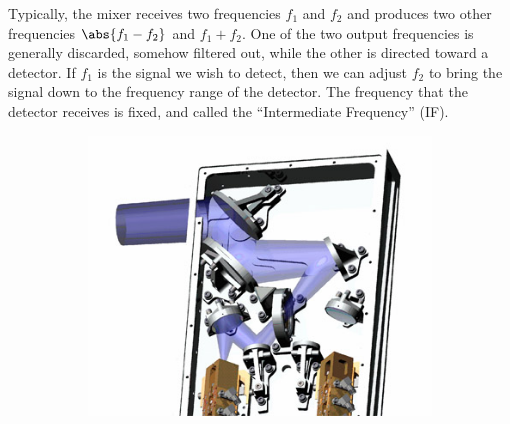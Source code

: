 Typically, the mixer receives two frequencies $f_1$ and $f_2$ and produces two other frequencies $\abs{f_1-f_2}$ and $f_1+f_2$.
One of the two output frequencies is generally discarded, somehow filtered out, while the other is directed toward a detector.
If $f_1$ is the signal we wish to detect, then we can adjust $f_2$ to bring the signal down to the frequency range of the detector.
The frequency that the detector receives is fixed, and called the ``Intermediate Frequency'' (IF).

\begin{figure}[hbtp]
    \centering
    \begin{subfigure}[c]{.7\textwidth}
        \includegraphics[width=\textwidth]{lou_band_5_drawing}
    \end{subfigure}%
    \begin{subfigure}[c]{.22\textwidth}

\end{subfigure}
\end{figure}
